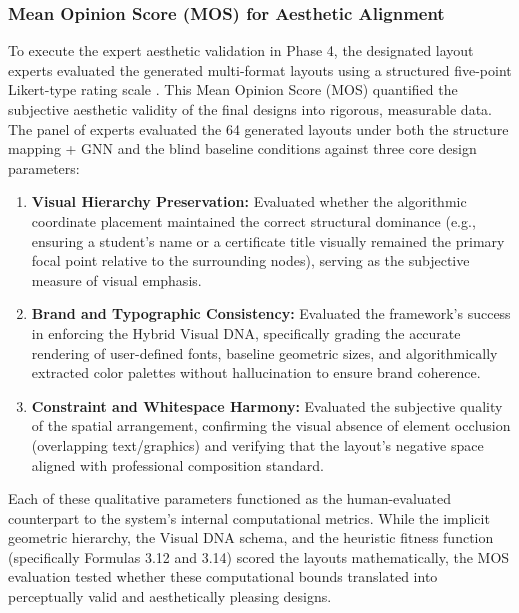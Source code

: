 \begin{refsection}
\subsubsection{Mean Opinion Score (MOS) for Aesthetic Alignment}
To execute the expert aesthetic validation in Phase 4, the designated layout experts evaluated the generated multi-format layouts using a structured five-point Likert-type rating scale \cite{likert1932technique}. This Mean Opinion Score (MOS) quantified the subjective aesthetic validity of the final designs into rigorous, measurable data. The panel of experts evaluated the 64 generated layouts under both the structure mapping + GNN and the blind baseline conditions against three core design parameters:
\begin{enumerate}
    \item \textbf{Visual Hierarchy Preservation:} Evaluated whether the algorithmic coordinate placement maintained the correct structural dominance (e.g., ensuring a student's name or a certificate title visually remained the primary focal point relative to the surrounding nodes), serving as the subjective measure of visual emphasis. \cite{ODonovan2014Layouts}
    \item \textbf{Brand and Typographic Consistency:} Evaluated the framework's success in enforcing the Hybrid Visual DNA, specifically grading the accurate rendering of user-defined fonts, baseline geometric sizes, and algorithmically extracted color palettes without hallucination to ensure brand coherence. \cite{wheeler2013designing}
    \item \textbf{Constraint and Whitespace Harmony:} Evaluated the subjective quality of the spatial arrangement, confirming the visual absence of element occlusion (overlapping text/graphics) and verifying that the layout's negative space aligned with professional composition standard. \cite{ODonovan2014Layouts, zhou2022cglgan}
\end{enumerate}
Each of these qualitative parameters functioned as the human-evaluated counterpart to the system's internal computational metrics. While the implicit geometric hierarchy, the Visual DNA schema, and the heuristic fitness function (specifically Formulas 3.12 and 3.14) scored the layouts mathematically, the MOS evaluation tested whether these computational bounds translated into perceptually valid and aesthetically pleasing designs.


\end{refsection}
